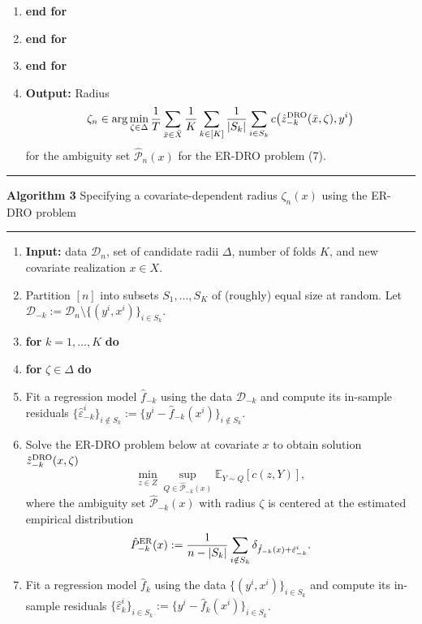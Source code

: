\documentclass[10pt,a4paper]{article}
\begin{document}
\begin{mdframed}[linewidth=0.6pt]
\begin{enumerate}[label=\arabic*:,leftmargin=19pt,itemsep=2pt,parsep=0pt]
\[
\hat P_{-k}^{\rm ER}(\bar x):=\frac1{n-|S_k|}\sum_{i\notin S_k}\delta_{\hat f_{-k}(\bar x)+\hat\varepsilon_{-k}^i}.
\]
\item \hspace{12pt}\textbf{end for}
\item \hspace{6pt}\textbf{end for}
\item \textbf{end for}
\item \textbf{Output:} Radius
\[
\zeta_n\in\arg\min_{\zeta\in\Delta}\frac1T\sum_{\bar x\in\bar X}\frac1K\sum_{k\in[K]}\frac1{|S_k|}\sum_{i\in S_k}c\bigl(\hat z_{-k}^{\rm DRO}(\bar x,\zeta),y^i\bigr)
\]
for the ambiguity set $\hat{\mathcal P}_n(x)$ for the ER-DRO problem (7).
\end{enumerate}
\hrule\smallskip
\textbf{Algorithm 3} Specifying a covariate-dependent radius $\zeta_n(x)$ using the ER-DRO problem
\hrule\smallskip
\begin{enumerate}[label=\arabic*:,leftmargin=19pt,itemsep=2pt,parsep=0pt]
\item \textbf{Input:} data $\mathcal D_n$, set of candidate radii $\Delta$, number of folds $K$, and new covariate realization $x\in X$.
\item Partition $[n]$ into subsets $S_1,\ldots,S_K$ of (roughly) equal size at random. Let $\mathcal D_{-k}:=\mathcal D_n\setminus\{(y^i,x^i)\}_{i\in S_k}$.
\item \textbf{for} $k=1,\ldots,K$ \textbf{do}
\item \hspace{6pt}\textbf{for} $\zeta\in\Delta$ \textbf{do}
\item \hspace{12pt}Fit a regression model $\hat f_{-k}$ using the data $\mathcal D_{-k}$ and compute its in-sample residuals $\{\hat\varepsilon_{-k}^i\}_{i\notin S_k}:=\{y^i-\hat f_{-k}(x^i)\}_{i\notin S_k}$.
\item \hspace{12pt}Solve the ER-DRO problem below at covariate $x$ to obtain solution $\hat z_{-k}^{\rm DRO}(x,\zeta)$
\[
\min_{z\in Z}\sup_{Q\in\hat{\mathcal P}_{-k}(x)}\mathbb E_{Y\sim Q}[c(z,Y)],
\]
where the ambiguity set $\hat{\mathcal P}_{-k}(x)$ with radius $\zeta$ is centered at the estimated empirical distribution
\[
\hat P_{-k}^{\rm ER}(x):=\frac1{n-|S_k|}\sum_{i\notin S_k}\delta_{\hat f_{-k}(x)+\hat\varepsilon_{-k}^i}.
\]
\item \hspace{12pt}Fit a regression model $\hat f_k$ using the data $\{(y^i,x^i)\}_{i\in S_k}$ and compute its in-sample residuals $\{\hat\varepsilon_k^i\}_{i\in S_k}:=\{y^i-\hat f_k(x^i)\}_{i\in S_k}$.

\end{enumerate}
\end{mdframed}
\end{document}
